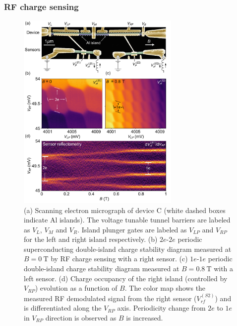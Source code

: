 \subsubsection{RF charge sensing}
\begin{figure}
	\includegraphics[width=0.7\textwidth]{Fig4-21.pdf}
	\caption[RF charge sensing of double Majorana island]{(a) Scanning electron micrograph of device C (white dashed boxes indicate Al islands). The voltage tunable tunnel barriers are labeled as $V_{L}$, $V_{M}$ and $V_{R}$. Island plunger gates are labeled as $V_{LP}$ and $V_{RP}$ for the left and right island respectively. (b) $2e$-$2e$ periodic superconducting double-island charge stability diagram measured at $B = \SI{0}{\tesla}$ by RF charge sensing with a right sensor. (c) $1e$-$1e$ periodic double-island charge stability diagram measured at $B = \SI{0.8}{\tesla}$ with a left sensor. (d) Charge occupancy of the right island (controlled by $V_{RP}$) evolution as a function of $B$. The color map shows the measured RF demodulated signal from the right sensor ($V^{(S2)}_{rf}$) and is differentiated along the $V_{RP}$ axis. Periodicity change from $2e$ to $1e$ in $V_{RP}$ direction is observed as $B$ is increased.}
	\label{fig:majo_d}
\end{figure}

